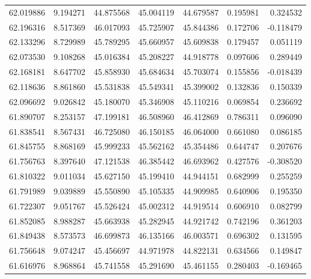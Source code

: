 \begin{tabular}{rrrrrrr}
 62.019886 &   9.194271 &         44.875568 &         45.004119 &         44.679587 &  0.195981 &  0.324532 \\
 62.196316 &   8.517369 &         46.017093 &         45.725907 &         45.844386 &  0.172706 & -0.118479 \\
 62.133296 &   8.729989 &         45.789295 &         45.660957 &         45.609838 &  0.179457 &  0.051119 \\
 62.073530 &   9.108268 &         45.016384 &         45.208227 &         44.918778 &  0.097606 &  0.289449 \\
 62.168181 &   8.647702 &         45.858930 &         45.684634 &         45.703074 &  0.155856 & -0.018439 \\
 62.118636 &   8.861860 &         45.531838 &         45.549341 &         45.399002 &  0.132836 &  0.150339 \\
 62.096692 &   9.026842 &         45.180070 &         45.346908 &         45.110216 &  0.069854 &  0.236692 \\
 61.890707 &   8.253157 &         47.199181 &         46.508960 &         46.412869 &  0.786311 &  0.096090 \\
 61.838541 &   8.567431 &         46.725080 &         46.150185 &         46.064000 &  0.661080 &  0.086185 \\
 61.845755 &   8.868169 &         45.999233 &         45.562162 &         45.354486 &  0.644747 &  0.207676 \\
 61.756763 &   8.397640 &         47.121538 &         46.385442 &         46.693962 &  0.427576 & -0.308520 \\
 61.810322 &   9.011034 &         45.627150 &         45.199410 &         44.944151 &  0.682999 &  0.255259 \\
 61.791989 &   9.039889 &         45.550890 &         45.105335 &         44.909985 &  0.640906 &  0.195350 \\
 61.722307 &   9.051767 &         45.526424 &         45.002312 &         44.919514 &  0.606910 &  0.082799 \\
 61.852085 &   8.988287 &         45.663938 &         45.282945 &         44.921742 &  0.742196 &  0.361203 \\
 61.849438 &   8.573573 &         46.699873 &         46.135166 &         46.003571 &  0.696302 &  0.131595 \\
 61.756648 &   9.074247 &         45.456697 &         44.971978 &         44.822131 &  0.634566 &  0.149847 \\
 61.616976 &   8.968864 &         45.741558 &         45.291690 &         45.461155 &  0.280403 & -0.169465 \\

\end{tabular}
